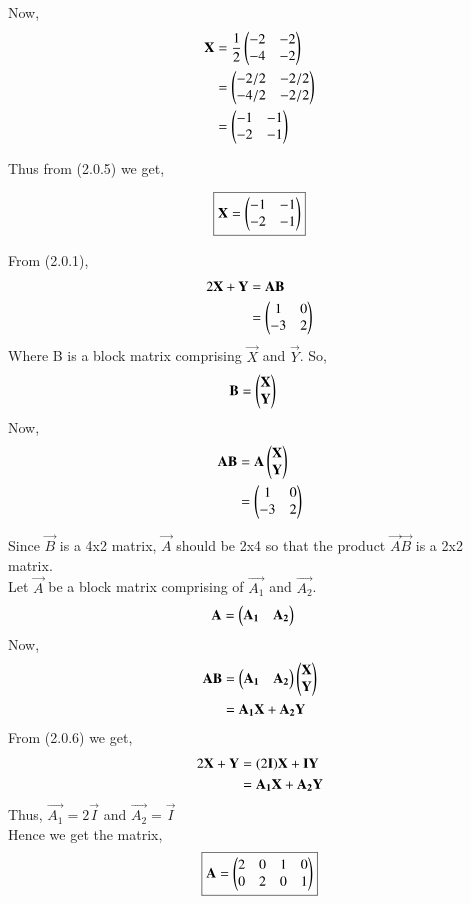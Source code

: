 \documentclass[journal,12pt,twocolumn]{IEEEtran}
\begin{document}
Now, 
\begin{align}
\vec{X} &= \frac{1}{2}\myvec{-2 & -2 \\ -4 & -2 } \\
&= \myvec{-2/2 & -2/2 \\ -4/2 & -2/2 }\notag \\
&= \myvec{-1 & -1 \\ -2 & -1}
\end{align}

Thus from (2.0.5) we get, 

\begin{align*}
    \boxed{ \vec{X} = \myvec{-1 & -1 \\ -2 & -1} }
\end{align*}

From (2.0.1), 
\begin{align}
    2\vec{X}+\vec{Y} &=\vec{A}\vec{B} \\
    &= \myvec{1 & 0 \\ -3 & 2}
\end{align}
Where B is a block matrix comprising $\vec{X}$ and $\vec{Y}$. So, 
\begin{align}
    \vec{B} &= \myvec{\vec{X} \\ \vec{Y}}
\end{align}
Now, 
\begin{align}
    \vec{A}\vec{B} &= \vec{A}\myvec{\vec{X} \\ \vec{Y}} \notag\\
    &= \myvec{1 & 0 \\ -3 & 2} 
\end{align}

Since $\vec{B}$ is a 4x2 matrix, $\vec{A}$ should be 2x4 so that the product $\vec{A}\vec{B}$ is a 2x2 matrix.\\ 
Let $\vec{A}$ be a block matrix comprising of $\vec{A_{1}}$ and
$\vec{A_{2}}$. 
\begin{align}
    \vec{A} &= \myvec{\vec{A_{1}}& \vec{A_{2}}}
\end{align}
Now, 
\begin{align}
    \vec{A}\vec{B} &= \myvec{\vec{A_{1}}& \vec{A_{2}}}\myvec{\vec{X} \\ \vec{Y}}\notag\\
    &= \vec{A_{1}}\vec{X} + \vec{A_{2}}\vec{Y}
\end{align}
From (2.0.6) we get, 
\begin{align}
    2\vec{X}+\vec{Y} &= (2\vec{I})\vec{X} + \vec{I}\vec{Y}\notag\\
    &=\vec{A_{1}}\vec{X} + \vec{A_{2}}\vec{Y}
\end{align}
Thus, $\vec{A_{1}} = 2\vec{I}$ and $\vec{A_{2}} = \vec{I}$ \\
Hence we get the matrix, 
\begin{align*}
    \boxed{\vec{A} =  \myvec{2 & 0 & 1 & 0 \\ 0 & 2 & 0 & 1}}
\end{align*}
\end{document}
